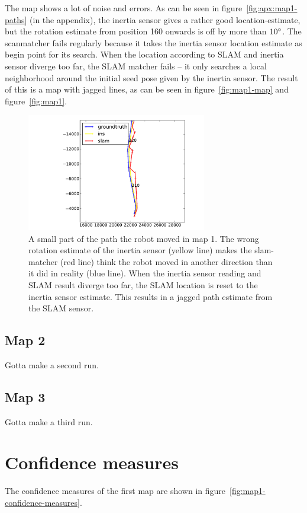 The map shows a lot of noise and errors. As can be seen in figure~\ref{fig:apx:map1-paths} (in the appendix), the inertia sensor gives a rather good location-estimate, but the rotation estimate from position 160 onwards is off by more than $10\degree$. The scanmatcher fails regularly because it takes the inertia sensor location estimate as begin point for its search. When the location according to SLAM and inertia sensor diverge too far, the SLAM matcher fails -- it only searches a local neighborhood around the initial seed pose given by the inertia sensor. The result of this is a map with jagged lines, as can be seen in figure~\ref{fig:map1-map} and figure~\ref{fig:map1}.

\begin{figure}[ht]
  \centering
  \includegraphics[width=0.7\textwidth]{images/experiment/map1/ins-problem.pdf}
  \caption{A small part of the path the robot moved in map 1. The wrong rotation estimate of the inertia sensor (yellow line) makes the slam-matcher (red line) think the robot moved in another direction than it did in reality (blue line). When the inertia sensor reading and SLAM result diverge too far, the SLAM location is reset to the inertia sensor estimate. This results in a jagged path estimate from the SLAM sensor.}
  \label{fig:map1-ins-problem}
\end{figure}

\subsection{Map 2}
Gotta make a second run.

\subsection{Map 3}
Gotta make a third run.

\section{Confidence measures}
The confidence measures of the first map are shown in figure~\ref{fig:map1-confidence-measures}.

